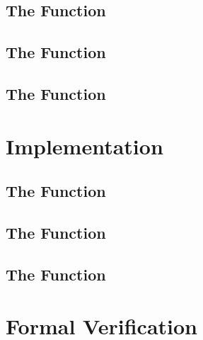 \subsection{The Function \bitstreamread}
\subsection{The Function }
\subsection{The Function }

\section{Implementation}
\subsection{The Function \bitstreamread}
\subsection{The Function }
\subsection{The Function }

\section{Formal Verification}
\subsection{}
\subsection{}

